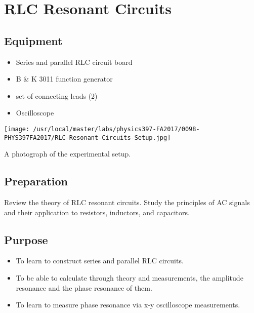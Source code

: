 

%
%


\setcounter{chapter}{6}
\setcounter{equation}{0}
\setcounter{table}{0}
\setcounter{figure}{0}
\chapter{RLC Resonant Circuits}

\section{Equipment}

\begin{minipage}[t]{0.6\textwidth}
\begin{itemize}[noitemsep]
\item Series and parallel RLC circuit board
\item B \& K 3011 function generator
\item set of connecting leads (2)
\end{itemize}
\end{minipage}
\begin{minipage}[t]{0.35\textwidth}
\begin{itemize}[noitemsep]
\item Oscilloscope
\end{itemize}
\end{minipage}

\begin{marginfigure}[+1in]
\texttt{[image: /usr/local/master/labs/physics397-FA2017/0098-PHYS397FA2017/RLC-Resonant-Circuits-Setup.jpg]}
\caption{A photograph of the experimental setup.}
\label{fig:RLsetup}
\end{marginfigure}

\section{Preparation}
Review the theory of RLC resonant circuits. Study the principles of AC signals and their application to resistors, inductors, and capacitors. 

\section{Purpose}
\begin{itemize}
    \item To learn to construct series and parallel RLC circuits.
    \item To be able to calculate through theory and measurements, the amplitude resonance and the phase resonance of them.
    \item To learn to measure phase resonance via x-y oscilloscope measurements.
\end{itemize}

